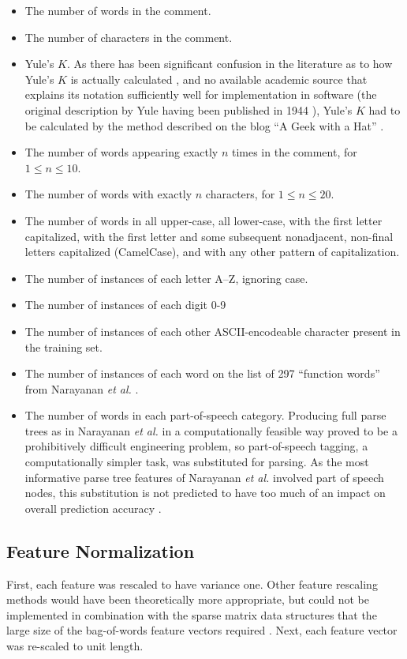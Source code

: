 \documentclass{article}
\begin{document}
\begin{itemize}
    \item The number of words in the comment.
    \item The number of characters in the comment.
    \item Yule's $K$. As there has been significant confusion in the literature as to how Yule's $K$ is actually calculated \cite{miranda2005yule}, and no available academic source that explains its notation sufficiently well for implementation in software (the original description by Yule having been published in 1944 \cite{yule1944statistical}), Yule's $K$ had to be calculated by the method described on the blog ``A Geek with a Hat'' \cite{teller2011measuring}.
    \item The number of words appearing exactly $n$ times in the comment, for $1 \le n \le 10$.
    \item The number of words with exactly $n$ characters, for $1 \le n \le 20$.
    \item The number of words in all upper-case, all lower-case, with the first letter capitalized, with the first letter and some subsequent nonadjacent, non-final letters capitalized (CamelCase), and with any other pattern of capitalization.
    \item The number of instances of each letter A--Z, ignoring case.
    \item The number of instances of each digit 0-9
    \item The number of instances of each other ASCII-encodeable character present in the training set.
    \item The number of instances of each word on the list of 297 ``function words'' from Narayanan \textit{et al.} \cite{narayanan2012feasibility}.
    \item The number of words in each part-of-speech category. Producing full parse trees as in Narayanan \textit{et al.} in a computationally feasible way proved to be a prohibitively difficult engineering problem, so part-of-speech tagging, a computationally simpler task, was substituted for parsing. As the most informative parse tree features of Narayanan \textit{et al.} involved part of speech nodes, this substitution is not predicted to have too much of an impact on overall prediction accuracy \cite{narayanan2012feasibility}.
    
\end{itemize}

\subsection{Feature Normalization}
First, each feature was rescaled to have variance one. Other feature rescaling methods would have been theoretically more appropriate, but could not be implemented in combination with the sparse matrix data structures that the large size of the bag-of-words feature vectors required  \cite{narayanan2012feasibility}. Next, each feature vector was re-scaled to unit length.
\end{document}
